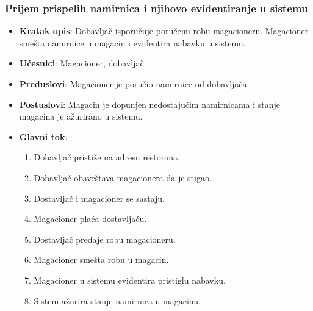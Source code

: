   \subsubsection{Prijem prispelih namirnica i njihovo evidentiranje u sistemu}
 \begin{itemize}
    \item \textbf{Kratak opis}:
   Dobavljač isporučuje poručenu robu magacioneru. Magacioner smešta namirnice u magacin i evidentira nabavku u sistemu.
    \item \textbf{Učesnici}:
    Magacioner, dobavljač
    \item \textbf{Preduslovi}:
    Magacioner je poručio namirnice od dobavljača.
    \item \textbf{Postuslovi}:
    Magacin je dopunjen nedostajućim namirnicama i stanje magacina je ažurirano u sistemu. 
    \item \textbf{Glavni tok}:
    \begin{enumerate}
        \item Dobavljač pristiže na adresu restorana.
        \item Dobavljač obaveštava magacionera da je stigao.
        \item Dostavljač i magacioner se sastaju.
        \item Magacioner plaća dostavljaču.
        \item Dostavljač predaje robu magacioneru.
        \item Magacioner smešta robu u magacin.
        \item Magacioner u sistemu evidentira pristiglu nabavku.
        \item Sistem ažurira stanje namirnica u magacinu.  
        
    \end{enumerate}

\end{itemize}
 
 
